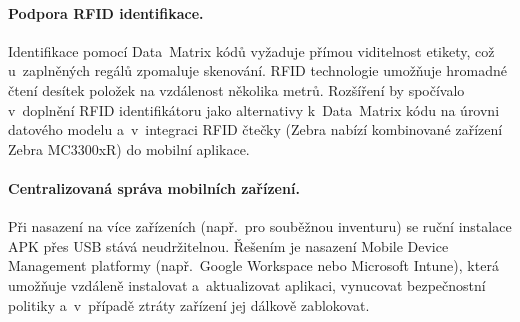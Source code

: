 \paragraph{Podpora RFID identifikace.}
Identifikace pomocí Data~Matrix kódů vyžaduje přímou viditelnost etikety, což u~zaplněných regálů zpomaluje skenování. RFID technologie umožňuje hromadné čtení desítek položek na vzdálenost několika metrů. Rozšíření by spočívalo v~doplnění RFID identifikátoru jako alternativy k~Data~Matrix kódu na úrovni datového modelu a~v~integraci RFID čtečky (Zebra nabízí kombinované zařízení Zebra MC3300xR) do mobilní aplikace.

\paragraph{Centralizovaná správa mobilních zařízení.}
Při nasazení na více zařízeních (např.\ pro souběžnou inventuru) se ruční instalace APK přes USB stává neudržitelnou. Řešením je nasazení Mobile Device Management platformy (např.\ Google Workspace nebo Microsoft Intune), která umožňuje vzdáleně instalovat a~aktualizovat aplikaci, vynucovat bezpečnostní politiky a~v~případě ztráty zařízení jej dálkově zablokovat.
